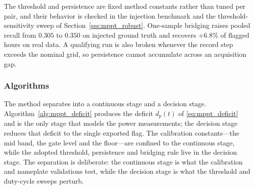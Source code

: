 The threshold and persistence are fixed method constants rather than tuned per pair, and their behavior is checked in the injection benchmark and the threshold-sensitivity sweep of Section~\ref{sss:mppt_robust}. One-sample bridging raises pooled recall from $0.305$ to $0.350$ on injected ground truth and recovers $+6.8\%$ of flagged hours on real data. A qualifying run is also broken whenever the record step exceeds the nominal grid, so persistence cannot accumulate across an acquisition gap.

\subsubsection{Algorithms}
\label{subsubsec:mppt_algorithms}

The method separates into a continuous stage and a decision stage. Algorithm~\ref{alg:mppt_deficit} produces the deficit $d_p(t)$ of \eqref{eq:mppt_deficit} and is the only stage that models the power measurements; the decision stage reduces that deficit to the single exported flag. The calibration constants---the mid band, the gate level and the floor---are confined to the continuous stage, while the adopted threshold, persistence and bridging rule live in the decision stage. The separation is deliberate: the continuous stage is what the calibration and nameplate validations test, while the decision stage is what the threshold and duty-cycle sweeps perturb.

